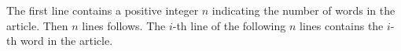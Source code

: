 The first line contains a positive integer $n$ indicating the number of 
words in the article. 
Then $n$ lines follows. The $i$-th line of the following $n$ lines
contains the $i$-th word in the article. 
